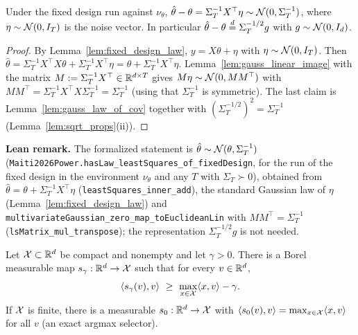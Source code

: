 \begin{lemma}\label{lem:least_squares_law}
\leanok
{}
Under the fixed design run against $\nu_\theta$,
$\hat\theta - \theta = \Sigma_T^{-1}X^\top\eta \sim \mathcal{N}(0,\Sigma_T^{-1})$, where
$\eta \sim \mathcal{N}(0,I_T)$ is the noise vector. In particular
$\hat\theta - \theta \overset{d}{=} \Sigma_T^{-1/2}g$ with $g \sim \mathcal{N}(0,I_d)$.
\end{lemma}

\begin{proof}
\leanok
{}
By Lemma~\ref{lem:fixed_design_law}, $y = X\theta + \eta$ with $\eta \sim \mathcal{N}(0,I_T)$. Then
$\hat\theta = \Sigma_T^{-1}X^\top X\theta + \Sigma_T^{-1}X^\top\eta = \theta + \Sigma_T^{-1}X^\top\eta$.
Lemma~\ref{lem:gauss_linear_image} with the matrix $M := \Sigma_T^{-1}X^\top \in \mathbb{R}^{d\times T}$
gives $M\eta \sim \mathcal{N}(0, MM^\top)$ with $MM^\top = \Sigma_T^{-1}X^\top X\Sigma_T^{-1} =
\Sigma_T^{-1}$ (using that $\Sigma_T^{-1}$ is symmetric). The last claim is
Lemma~\ref{lem:gauss_law_of_cov} together with $(\Sigma_T^{-1/2})^2 = \Sigma_T^{-1}$
(Lemma~\ref{lem:sqrt_props}(ii)).
\end{proof}

\textbf{Lean remark.} The formalized statement is
$\hat\theta \sim \mathcal{N}(\theta, \Sigma_T^{-1})$ (\texttt{Maiti2026Power.hasLaw\_leastSquares\_of\_fixedDesign},
for the run of the fixed design in the environment $\nu_\theta$ and any $T$ with
$\Sigma_T \succ 0$), obtained from $\hat\theta = \theta + \Sigma_T^{-1}X^\top\eta$
(\texttt{leastSquares\_inner\_add}), the standard Gaussian law of $\eta$
(Lemma~\ref{lem:fixed_design_law}) and \texttt{multivariateGaussian\_zero\_map\_toEuclideanLin}
with $M M^\top = \Sigma_T^{-1}$ (\texttt{lsMatrix\_mul\_transpose}); the representation
$\Sigma_T^{-1/2}g$ is not needed.

\begin{lemma}\label{lem:approx_argmax_selector}
\leanok
{}
Let $\mathcal{X} \subset \mathbb{R}^d$ be compact and nonempty and let $\gamma > 0$. There is a Borel measurable
map $s_\gamma : \mathbb{R}^d \to \mathcal{X}$ such that for every $v \in \mathbb{R}^d$,
\[
  \ip{s_\gamma(v)}{v} \ \ge\ \max_{x\in\Xs}\ip{x}{v} - \gamma .
\]
If $\mathcal{X}$ is finite, there is a measurable $s_0 : \mathbb{R}^d \to \mathcal{X}$ with $\langle s_0(v), v \rangle =
\max_{x\in\mathcal{X}}\langle x, v \rangle$ for all $v$ (an exact argmax selector).
\end{lemma}


